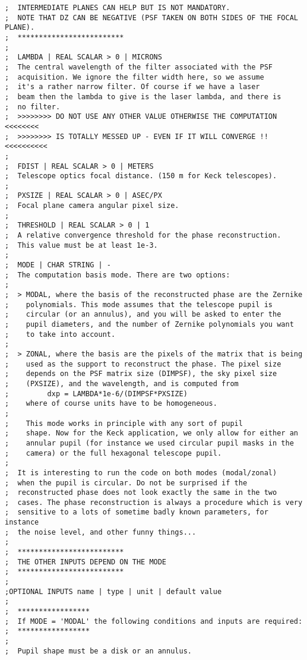 \begin{lstlisting}
;  INTERMEDIATE PLANES CAN HELP BUT IS NOT MANDATORY.
;  NOTE THAT DZ CAN BE NEGATIVE (PSF TAKEN ON BOTH SIDES OF THE FOCAL PLANE).
;  *************************
;
;  LAMBDA | REAL SCALAR > 0 | MICRONS
;  The central wavelength of the filter associated with the PSF
;  acquisition. We ignore the filter width here, so we assume
;  it's a rather narrow filter. Of course if we have a laser
;  beam then the lambda to give is the laser lambda, and there is
;  no filter. 
;  >>>>>>>> DO NOT USE ANY OTHER VALUE OTHERWISE THE COMPUTATION <<<<<<<<
;  >>>>>>>> IS TOTALLY MESSED UP - EVEN IF IT WILL CONVERGE !! <<<<<<<<<<
;
;  FDIST | REAL SCALAR > 0 | METERS
;  Telescope optics focal distance. (150 m for Keck telescopes).
;
;  PXSIZE | REAL SCALAR > 0 | ASEC/PX
;  Focal plane camera angular pixel size.
;
;  THRESHOLD | REAL SCALAR > 0 | 1
;  A relative convergence threshold for the phase reconstruction.
;  This value must be at least 1e-3.
;
;  MODE | CHAR STRING | -
;  The computation basis mode. There are two options:
;
;  > MODAL, where the basis of the reconstructed phase are the Zernike
;    polynomials. This mode assumes that the telescope pupil is
;    circular (or an annulus), and you will be asked to enter the
;    pupil diameters, and the number of Zernike polynomials you want
;    to take into account.
;
;  > ZONAL, where the basis are the pixels of the matrix that is being
;    used as the support to reconstruct the phase. The pixel size
;    depends on the PSF matrix size (DIMPSF), the sky pixel size
;    (PXSIZE), and the wavelength, and is computed from
;         dxp = LAMBDA*1e-6/(DIMPSF*PXSIZE)
;    where of course units have to be homogeneous.
;
;    This mode works in principle with any sort of pupil
;    shape. Now for the Keck application, we only allow for either an
;    annular pupil (for instance we used circular pupil masks in the
;    camera) or the full hexagonal telescope pupil.
;
;  It is interesting to run the code on both modes (modal/zonal)
;  when the pupil is circular. Do not be surprised if the
;  reconstructed phase does not look exactly the same in the two
;  cases. The phase reconstruction is always a procedure which is very
;  sensitive to a lots of sometime badly known parameters, for instance
;  the noise level, and other funny things... 
;
;  *************************
;  THE OTHER INPUTS DEPEND ON THE MODE
;  *************************
;
;OPTIONAL INPUTS name | type | unit | default value
;
;  *****************
;  If MODE = 'MODAL' the following conditions and inputs are required:
;  *****************
;
;  Pupil shape must be a disk or an annulus.

\end{lstlisting}
